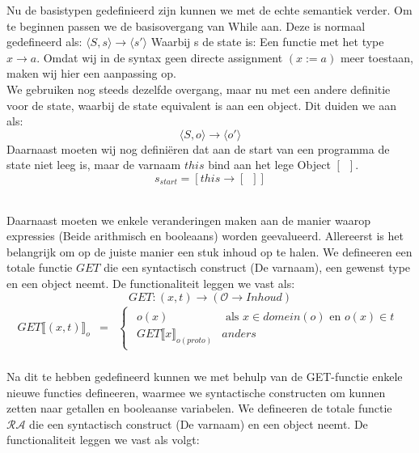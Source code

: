 \documentclass[12pt]{article}
\newcommand{\RA}{\mathcal{RA}}
\begin{document}
Nu de basistypen gedefinieerd zijn kunnen we met de echte semantiek verder. Om te beginnen passen we de basisovergang van While aan. Deze is normaal gedefineerd als:
$ \langle S,s \rangle \rightarrow \langle s\prime \rangle $
Waarbij s de state is: Een functie met het type
$ x \rightarrow a $.
Omdat wij in de syntax geen directe assignment $(x := a)$ meer toestaan, maken wij hier een aanpassing op.\\
We gebruiken nog steeds dezelfde overgang, maar nu met een andere definitie voor de state, waarbij de state equivalent is aan een object. Dit duiden we aan als:
$$ \langle S,o \rangle \rightarrow \langle o\prime \rangle $$
Daarnaast moeten wij nog definiëren dat aan de start van een programma de state niet leeg is, maar de varnaam $ this $ bind aan het lege Object $ [\enspace] $.
$$ s_{start} = [this \rightarrow [\enspace]]$$
\\
\par
Daarnaast moeten we enkele veranderingen maken aan de manier waarop expressies (Beide arithmisch en booleaans) worden geevalueerd. 
Allereerst is het belangrijk om op de juiste manier een stuk inhoud op te halen. We defineeren een totale functie $ GET $ die een syntactisch construct (De varnaam), een gewenst type en een object neemt. De functionaliteit leggen we vast als:
\[ GET: (x,t) \rightarrow (\mathcal{O} \rightarrow Inhoud) \]
\[
\begin{matrix}
GET\llbracket (x,t) \rrbracket_o & = & 
\begin{cases}
\begin{matrix}
o(x) & \mbox{ als } x \in domein(o) \mbox{ en } o(x) \in t\\
GET\llbracket x \rrbracket_{o(proto)} & anders
\end{matrix}
\end{cases}\\
\end{matrix}
\]

Na dit te hebben gedefineerd kunnen we met behulp van de GET-functie enkele nieuwe functies defineeren, waarmee we syntactische constructen om kunnen zetten naar getallen en booleaanse variabelen. We defineeren de totale functie $ \RA $ die een syntactisch construct (De varnaam) en een object neemt. De functionaliteit leggen we vast als volgt:
\end{document}
